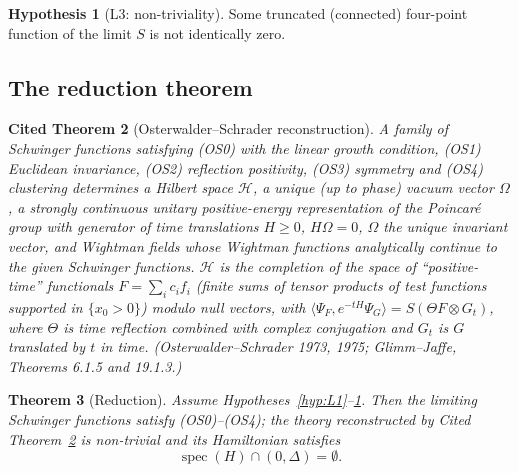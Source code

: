 \documentclass[11pt,a4paper]{article}
\newtheorem{theorem}{Theorem}[section]
\newtheorem{citedtheorem}[theorem]{Cited Theorem}
\theoremstyle{definition}
\newtheorem{hypothesis}[theorem]{Hypothesis}
\theoremstyle{remark}
\DeclareMathOperator{\spec}{spec}
\newcommand{\cH}{\mathcal{H}}
\newcommand{\ip}[2]{\langle #1,#2\rangle}
\begin{document}
\begin{hypothesis}[L3: non-triviality]\label{hyp:L3}
Some truncated (connected) four-point function of the limit $S$ is not identically zero.
\end{hypothesis}

\subsection{The reduction theorem}

\begin{citedtheorem}[Osterwalder--Schrader reconstruction]\label{thm:OS}
A family of Schwinger functions satisfying (OS0) with the linear growth condition, (OS1) Euclidean invariance,
(OS2) reflection positivity, (OS3) symmetry and (OS4) clustering determines a Hilbert space $\cH$, a unique (up to
phase) vacuum vector $\Omega$, a strongly continuous unitary positive-energy representation of the Poincaré group with
generator of time translations $H\ge0$, $H\Omega=0$, $\Omega$ the unique invariant vector, and Wightman fields whose
Wightman functions analytically continue to the given Schwinger functions. $\cH$ is the completion of the space of
``positive-time'' functionals $F=\sum_ic_if_i$ (finite sums of tensor products of test functions supported in
$\{x_0>0\}$) modulo null vectors, with
$\ip{\Psi_F}{e^{-tH}\Psi_G}=S(\Theta F\otimes G_t)$, where $\Theta$ is time reflection combined with complex conjugation
and $G_t$ is $G$ translated by $t$ in time. (Osterwalder--Schrader 1973, 1975; Glimm--Jaffe, Theorems 6.1.5 and 19.1.3.)
\end{citedtheorem}

\begin{theorem}[Reduction]\label{thm:reduction}
Assume Hypotheses~\ref{hyp:L1}--\ref{hyp:L3}. Then the limiting Schwinger functions satisfy (OS0)--(OS4); the theory
reconstructed by Cited Theorem~\ref{thm:OS} is non-trivial and its Hamiltonian satisfies
\[
\spec(H)\cap(0,\Delta)=\emptyset .
\]
\end{theorem}
\end{document}
